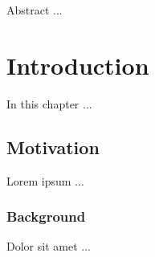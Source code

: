 
Abstract ...

\newpage

\tableofcontents

\newpage

\chapter{Introduction}

In this chapter ...

\section{Motivation}

Lorem ipsum ...

\subsection{Background}

Dolor sit amet \cite{lit} ...

\newpage


